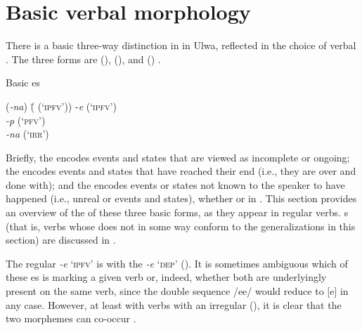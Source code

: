 
\section{Basic verbal morphology}\label{sec:4.2}


There is a basic three-way distinction in  in Ulwa, reflected in the choice of verbal . The three forms are  (),  (), and  () .

\ea%
    \label{ex:verbs:1f}
            Basic  es\\
\begin{tabbing}
{(\textit{-na})} \= {( (‘\textsc{ipfv}’))}\kill
{-\textit{e}} \> { (‘\textsc{ipfv}’)}\\
{\textit{-p}} \> { (‘\textsc{pfv}’)}\\
{\textit{-na}} \> { (‘\textsc{irr}’)}
\end{tabbing}
 \z

Briefly, the   encodes events and states that are viewed as incomplete or ongoing; the   encodes events and states that have reached their end (i.e., they are over and done with); and the   encodes events or states not known to the speaker to have happened (i.e., unreal or  events and states), whether  or  in . This section provides an overview of the  of these three basic forms, as they appear in regular verbs. s (that is, verbs whose  does not in some way conform to the generalizations in this section) are discussed in . 

The regular   \textit{{}-e} ‘\textsc{ipfv}’ is  with the  \textit{{}-e} ‘\textsc{dep}’ (). It is sometimes ambiguous which of these es is marking a given verb or, indeed, whether both are underlyingly present on the same verb, since the double  sequence /ee/ would reduce to [e] in any case. However, at least with verbs with an irregular   (), it is clear that the two morphemes can co-occur .

